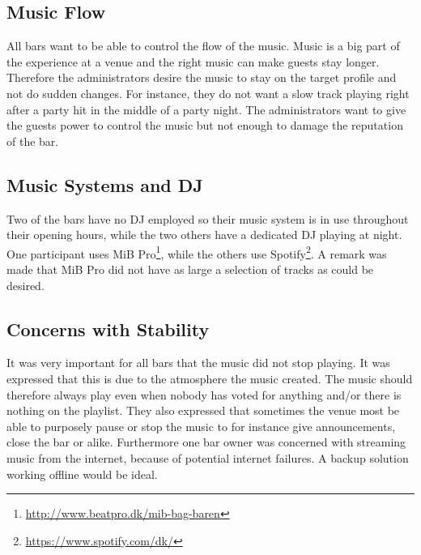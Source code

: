 \subsection{Music Flow}
\label{sub:MusicFlow}
All bars want to be able to control the flow of the music. Music is a big part of the experience at a venue and the right music can make guests stay longer. Therefore the administrators desire the music to stay on the target profile and not do sudden changes. For instance, they do not want a slow track playing right after a party hit in the middle of a party night. The administrators want to give the guests power to control the music but not enough to damage the reputation of the bar.


\subsection{Music Systems and DJ}
\label{sub:differences}
Two of the bars have no DJ employed so their music system is in use throughout their opening hours, while the two others have a dedicated DJ playing at night. One participant uses MiB Pro\footnote{\url{http://www.beatpro.dk/mib-bag-baren}}, while the others use Spotify\footnote{\url{https://www.spotify.com/dk/}}. A remark was made that MiB Pro did not have as large a selection of tracks as could be desired.

\subsection{Concerns with Stability}
\label{sub:specific_remarks}
It was very important for all bars that the music did not stop playing. It was expressed that this is due to the atmosphere the music created. The music should therefore always play even when nobody has voted for anything and/or there is nothing on the playlist. They also expressed that sometimes the venue most be able to purposely pause or stop the music to for instance give announcements, close the bar or alike. Furthermore one bar owner was concerned with streaming music from the internet, because of potential internet failures. A backup solution working offline would be ideal.

